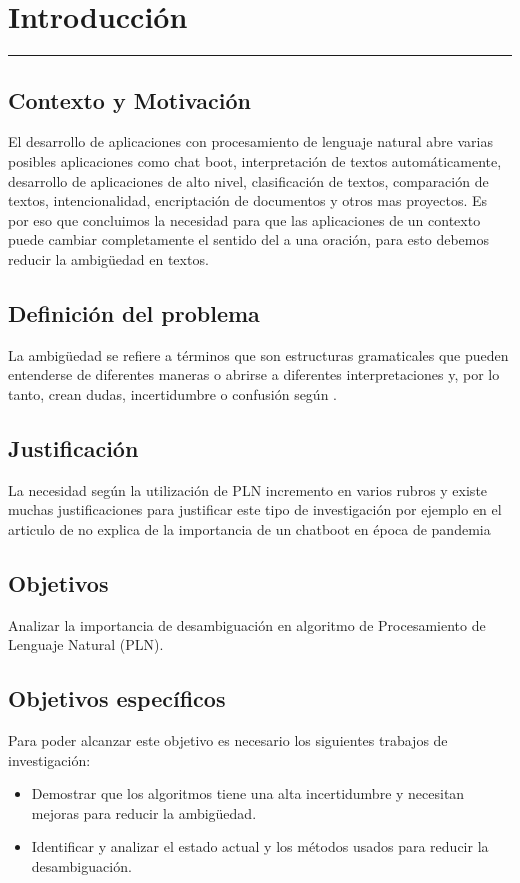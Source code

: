 \chapter{Introducción}
\hrule \bigskip \vspace*{1cm}
\section{Contexto y Motivación}
El desarrollo de aplicaciones con procesamiento de lenguaje natural abre varias posibles aplicaciones como chat boot, interpretación de textos automáticamente, desarrollo de aplicaciones de alto nivel, clasificación de textos, comparación de textos, intencionalidad, encriptación de documentos y otros mas proyectos. Es por eso que concluimos la necesidad para que las aplicaciones  de un contexto puede cambiar completamente el sentido del  a una oración, para esto debemos reducir la ambigüedad en textos.

\section{Definición del problema}
La ambigüedad se refiere a términos que son estructuras gramaticales que pueden entenderse de diferentes maneras o abrirse a diferentes interpretaciones y, por lo tanto, crean dudas, incertidumbre o confusión según \cite{EvaluacionAmbiguedad01}.

\section{Justificación}
La necesidad según \cite{Arquitectura} la utilización de PLN incremento en varios rubros y
existe muchas justificaciones para justificar este tipo de investigación por ejemplo en el articulo de \cite{ChatBoot} no explica de la importancia de un chatboot en época de pandemia


\section{Objetivos}

 Analizar la importancia de desambiguación en algoritmo de Procesamiento de Lenguaje Natural (PLN).

\section{Objetivos específicos}
Para poder alcanzar este objetivo es necesario los siguientes trabajos de investigación:
\begin{itemize}
  \item Demostrar que los algoritmos tiene una alta incertidumbre y necesitan mejoras para reducir la ambigüedad.
  \item Identificar y analizar el estado actual y los métodos usados para reducir la desambiguación.
\end{itemize}

